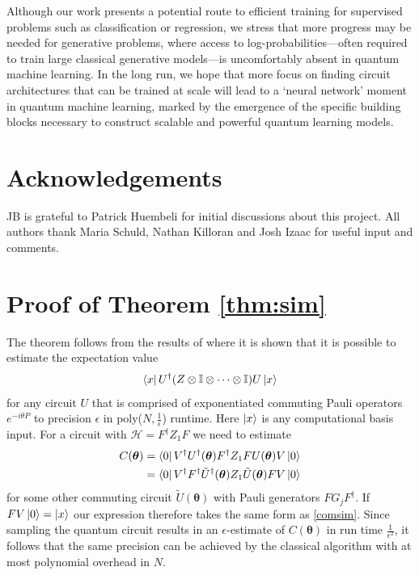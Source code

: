 \documentclass[a4paper,twocolumn,11pt]{quantumarticle}
\renewcommand{\vec}{\boldsymbol}
\begin{document}

Although our work presents a potential route to efficient training for supervised problems such as classification or regression, we stress that more progress may be needed for generative problems, where access to log-probabilities---often required to train large classical generative models---is uncomfortably absent in quantum machine learning. In the long run, we hope that more focus on finding circuit architectures that can be trained at scale will lead to a `neural network' moment in quantum machine learning, marked by the emergence of the specific building blocks necessary to construct scalable and powerful quantum learning models. 

\section{Acknowledgements}
JB is grateful to Patrick Huembeli for initial discussions about this project. All authors thank Maria Schuld, Nathan Killoran and Josh Izaac for useful input and comments.






\appendix


\section{Proof of Theorem \ref{thm:sim}}\label{app:simproof}
The theorem follows from the results of \cite{ni2012commuting} where it is shown that it is possible to estimate the expectation value 
\begin{align}\label{comsim}
    \bra{x}U^{\dagger}(Z\otimes\mathbb{I}\otimes\cdots\otimes\mathbb{I})U\ket{x}
\end{align}
for any circuit $U$ that is comprised of exponentiated commuting Pauli operators $e^{-i\theta P}$  to precision $\epsilon$ in poly($N,\frac{1}{\epsilon}$) runtime. Here $\ket{x}$ is any computational basis input. For a circuit with $\mathcal{H}=F^\dagger Z_1 F$ we need to estimate
\begin{align}
    C(\vec{\theta})&=\bra{0}V^{\dagger} U^{\dagger}(\vec{\theta})F^{\dagger} Z_1 F {U}(\vec{\theta})V\ket{0}\\ &= \bra{0}V^{\dagger}F^{\dagger} \tilde{U}^{\dagger}(\vec{\theta}) Z_1 \tilde{U}(\vec{\theta})FV\ket{0}\label{killer}
\end{align}
%
for some other commuting circuit $\tilde{U}(\vec{\theta})$ with Pauli generators $
F G_j F^\dagger$. If $FV\ket{0}=\ket{x}$ our expression therefore takes the same form as \eqref{comsim}. Since sampling the quantum circuit results in an $\epsilon$-estimate of $C(\vec{\theta})$ in run time $\frac{1}{\epsilon^2}$, it follows that the same precision can be achieved by the classical algorithm with at most polynomial overhead in $N$. 
\end{document}

